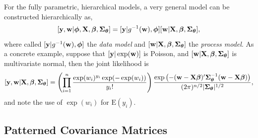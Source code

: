 \documentclass[12pt, titlepage]{article}
\begin{document}
For the fully parametric, hierarchical models, a very general model can be constructed hierarchically as,
\begin{equation} \label{eq:hglmm}
[\mathbf{y},\mathbf{w}|\boldsymbol{\phi},\mathbf{X},\boldsymbol{\beta},\mbox{\boldmath $\Sigma$}_{\boldsymbol{\theta}}] = [\mathbf{y}|g^{-1}(\mathbf{w}),\boldsymbol{\phi}][\mathbf{w}|\mathbf{X}, \boldsymbol{\beta},\mbox{\boldmath $\Sigma$}_{\boldsymbol{\theta}}],
\end{equation}
where \citet{berliner_hierarchical_1996} called $[\mathbf{y}|g^{-1}(\mathbf{w}),\boldsymbol{\phi}]$ the \textit{data model} and $[\mathbf{w}|\mathbf{X}, \boldsymbol{\beta},\mbox{\boldmath $\Sigma$}_{\boldsymbol{\theta}}]$ the \textit{process model}. As a concrete example, suppose that $[\mathbf{y}|\exp(\mathbf{w})]$ is Poisson, and $[\mathbf{w}|\mathbf{X},\boldsymbol{\beta},\mbox{\boldmath $\Sigma$}_{\boldsymbol{\theta}}]$ is multivariate normal, then the joint likelihood is
$$
[\mathbf{y},\mathbf{w}|\mathbf{X},\boldsymbol{\beta},\mbox{\boldmath $\Sigma$}_{\boldsymbol{\theta}}] = \left(\prod_{i=1}^{n}\frac{\exp(w_{i})^{y_{i}}\exp(-\exp(w_i))}{y_{i}!}\right)\frac{\exp\left(-(\mathbf{w} - \mathbf{X}\boldsymbol{\beta})^{\prime}\mbox{\boldmath $\Sigma$}_{\boldsymbol{\theta}}^{-1}(\mathbf{w} - \mathbf{X}\boldsymbol{\beta})\right)}{(2\pi)^{n/2}|\mbox{\boldmath $\Sigma$}_{\boldsymbol{\theta}}|^{1/2}},
$$
and note the use of $\exp(w_{i})$ for $\textrm{E}(y_{i})$.


\subsection{Patterned Covariance Matrices} \label{sec:patCovMat}
\end{document}
